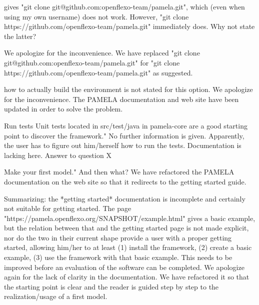\documentclass[10pt]{article}
\begin{document}

\begin{response}{gives "git clone git@github.com:openflexo-team/pamela.git", which (even when using my own username) does not work. However, "git clone https://github.com/openflexo-team/pamela.git" immediately does. Why not state the latter?
}

We apologize for the inconvenience. We have replaced "git clone git@github.com:openflexo-team/pamela.git" for "git clone https://github.com/openflexo-team/pamela.git" as suggested.
\end{response}

\begin{response}{how to actually build the environment is not stated for this option.}
We apologize for the inconvenience. The PAMELA documentation and web site have been updated in order to solve the problem.
\end{response}

\begin{response}{Run tests Unit tests located in src/test/java in pamela-core are a good starting point to discover the framework." No further information is given. Apparently, the user has to figure out him/herself how to run the tests. Documentation is lacking here.
}
 Answer to question X 
\end{response}

\begin{response}{Make your first model." And then what?
}
We have refactored the PAMELA documentation on the web site so that it redirects to the getting started guide.
\end{response}

\begin{response}{Summarizing: the *getting started* documentation is incomplete and certainly not suitable for getting started. The page "https://pamela.openflexo.org/SNAPSHOT/example.html" gives a basic example, but the relation between that and the getting started page is not made explicit, nor do the two in their current shape provide a user with a proper getting started, allowing him/her to at least (1) install the framework, (2) create a basic example, (3) use the framework with that basic example. This needs to be improved before an evaluation of the software can be completed.
}
We apologize again for the lack of clarity in the documentation. We have refactored it so that the starting point is clear and the reader is guided step by step to the realization/usage of a first model.
\end{response}
\end{document}
